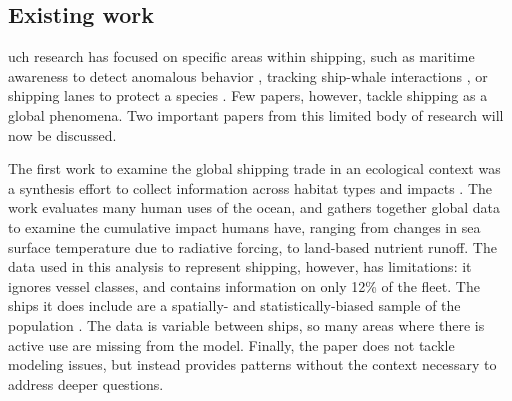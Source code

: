 \documentclass[12pt,letterpaper]{article}
\begin{document}
\subsection{Existing work}
uch research has focused on specific areas within shipping, such as maritime awareness to detect anomalous behavior \citep{Tun2007}, tracking ship-whale interactions \citep{jensen2004large}, or shipping lanes to protect a species \citep{Lagueux2011,Mckenna2012a}.  Few papers, however, tackle shipping as a global phenomena. Two important papers from this limited body of research will now be discussed.

The first work %
to examine the global shipping trade in an ecological context was a synthesis effort to collect information across habitat types and impacts \citep{Halpern2008}. The work evaluates many human uses of the ocean, and gathers together global data to examine the cumulative impact humans have, ranging from changes in sea surface temperature due to radiative forcing, to land-based nutrient runoff. The data used in this analysis to represent shipping, however, has limitations: it ignores vessel classes, %
 and contains information on only 12\% of the fleet. The ships it does include are a spatially- and statistically-biased sample of the population \citep{Wang2007}. The data is variable between ships, so many areas where there is active use are missing from the model. Finally, the paper does not tackle modeling issues, but instead provides patterns without the context necessary to address deeper questions. %

\end{document}
